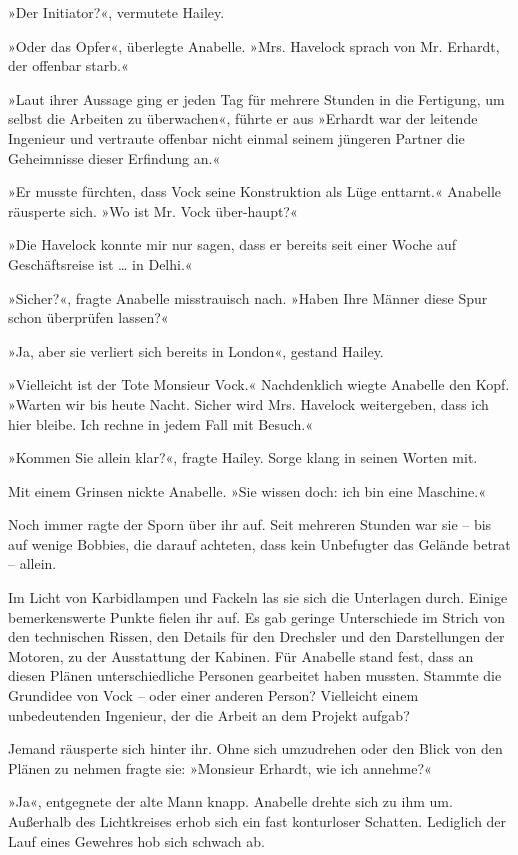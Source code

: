 »Der Initiator?«, vermutete Hailey.

»Oder das Opfer«, überlegte Anabelle. »Mrs. Havelock sprach von Mr.
Erhardt, der offenbar starb.«

»Laut ihrer Aussage ging er jeden Tag für mehrere Stunden in die
Fertigung, um selbst die Arbeiten zu überwachen«, führte er aus
»Erhardt war der leitende Ingenieur und vertraute offenbar nicht
einmal seinem jüngeren Partner die Geheimnisse dieser Erfindung
an.«

»Er musste fürchten, dass Vock seine Konstruktion als Lüge
enttarnt.« Anabelle räusperte sich. »Wo ist Mr. Vock über-haupt?«

»Die Havelock konnte mir nur sagen, dass er bereits seit einer
Woche auf Geschäftsreise ist … in Delhi.«

»Sicher?«, fragte Anabelle misstrauisch nach. »Haben Ihre Männer
diese Spur schon überprüfen lassen?«

»Ja, aber sie verliert sich bereits in London«, gestand Hailey.

»Vielleicht ist der Tote Monsieur Vock.« Nachdenklich wiegte
Anabelle den Kopf. »Warten wir bis heute Nacht. Sicher wird Mrs.
Havelock weitergeben, dass ich hier bleibe. Ich rechne in jedem
Fall mit Besuch.«

»Kommen Sie allein klar?«, fragte Hailey. Sorge klang in seinen
Worten mit.

Mit einem Grinsen nickte Anabelle. »Sie wissen doch: ich bin eine
Maschine.«

\tb

Noch immer ragte der Sporn über ihr auf. Seit mehreren Stunden war
sie – bis auf wenige Bobbies, die darauf achteten, dass kein
Unbefugter das Gelände betrat – allein.

Im Licht von Karbidlampen und Fackeln las sie sich die Unterlagen
durch. Einige bemerkenswerte Punkte fielen ihr auf. Es gab geringe
Unterschiede im Strich von den technischen Rissen, den Details für
den Drechsler und den Darstellungen der Motoren, zu der Ausstattung
der Kabinen. Für Anabelle stand fest, dass an diesen Plänen
unterschiedliche Personen gearbeitet haben mussten. Stammte die
Grundidee von Vock – oder einer anderen Person? Vielleicht einem
unbedeutenden Ingenieur, der die Arbeit an dem Projekt aufgab?

Jemand räusperte sich hinter ihr. Ohne sich umzudrehen oder den
Blick von den Plänen zu nehmen fragte sie: »Monsieur Erhardt, wie
ich annehme?«

»Ja«, entgegnete der alte Mann knapp. Anabelle drehte sich zu ihm
um. Außerhalb des Lichtkreises erhob sich ein fast konturloser
Schatten. Lediglich der Lauf eines Gewehres hob sich schwach ab.

